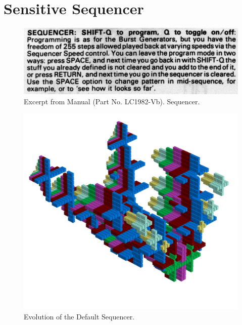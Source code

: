 \chapter{Sensitive Sequencer} 
\lstset{style=6502Style}

\begin{figure}[H]
    \centering
    \begin{adjustbox}{width=10.5cm,margin=0cm}
      \includegraphics[width=12cm]{src/sequencer/sequencer.png}%
    \end{adjustbox}
    \caption{
      Excerpt from Manual (Part No. LC1982-Vb). Sequencer.
      }
\end{figure}


\clearpage                                                                 
\begin{figure}[H]                                                          
    \centering                                                             
    \begin{adjustbox}{width=14cm,center, margin= 0cm 2cm}                                   
      \includegraphics[width=14cm]{src/sequencer/pattern0-45.png}%
    \end{adjustbox}                                                        
\caption{Evolution of the Default Sequencer.}                                           
\end{figure}                                                               
\clearpage                                                                 
                                                                           
